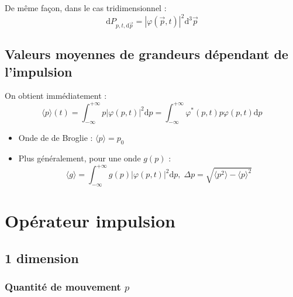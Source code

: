 De même façon, dans le cas tridimensionnel :
\begin{equation}
  \mathrm{d}P _{p, t, \mathrm{d} \overrightarrow{p}} = |\varphi(\overrightarrow{p},t)| ^{2} \mathrm{d} ^{3} \overrightarrow{p}
\end{equation}

\subsection{Valeurs moyennes de grandeurs dépendant de l'impulsion} %
\label{sub:Valeurs moyennes de grandeurs dépendant de l'impulsion}

On obtient immédiatement : 
\begin{equation}
  \langle p \rangle(t) = \int_{- \infty}^{+ \infty} p |\varphi(p,t)| ^{2} \mathrm{d} p = \int_{- \infty}^{+ \infty} \varphi ^{*}(p, t) p \varphi(p, t) \mathrm{d}p
\label{eq:1}
\end{equation}

\begin{itemize}

    \item Onde de de Broglie : $\langle p \rangle = p_0$ 
    \item Plus généralement, pour une onde $g(p)$ : 
      \begin{equation}
        \langle g \rangle = \int_{- \infty}^{+ \infty} g(p) |\varphi(p,t)| ^{2} \mathrm{d}p, \; \Delta p = \sqrt{\langle p ^{2} \rangle - \langle p \rangle ^{2}}
      \end{equation}

\end{itemize}

\newpage
\section{Opérateur impulsion} %
\label{sec:Opérateur impulsion}

\subsection{1 dimension} %
\label{sub:Opérateur impulsion}

\subsubsection{Quantité de mouvement $p$} %
\label{sec:Quantité de mouvement $p$}

